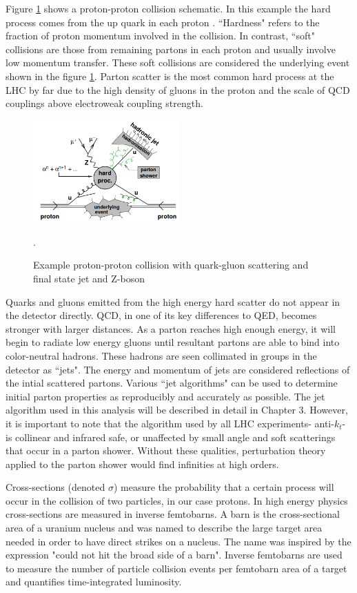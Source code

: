 Figure \ref{fig:protonproton} shows a proton-proton collision schematic. In this example the hard process comes from the up quark in each proton \cite{Butterworth}. ``Hardness" refers to the fraction of proton momentum involved in the collision. In contrast, ``soft" collisions are those from remaining partons in each proton and usually involve low momentum transfer. These soft collisions are considered the underlying event shown in the figure \ref{fig:protonproton}. Parton scatter is the most common hard process at the LHC by far due to the high density of gluons in the proton and the scale of QCD couplings above electroweak coupling strength. 
\begin{figure}[H]
        \centering
    \includegraphics[width=0.5\textwidth] {Pictures/protonproton.png}\hspace{1cm}
    \caption{Example proton-proton collision with quark-gluon scattering and final state jet and Z-boson \cite{Butterworth}}.
    \label{fig:protonproton}
\end{figure}
Quarks and gluons emitted from the high energy hard scatter do not appear in the detector directly. QCD, in one of its key differences to QED, becomes stronger with larger distances. As a parton reaches high enough energy, it will begin to radiate low energy gluons until resultant partons are able to bind into color-neutral hadrons. These hadrons are seen collimated in groups in the detector as ``jets". The energy and momentum of jets are considered reflections of the intial scattered partons. Various ``jet algorithms" can be used to determine initial parton properties as reproducibly and accurately as possible. The jet algorithm used in this analysis will be described in detail in Chapter 3. However, it is important to note that the algorithm used by all LHC experiments- anti-$k_t$- is collinear and infrared safe, or unaffected by small angle and soft scatterings that occur in a parton shower. Without these qualities, perturbation theory applied to the parton shower would find infinities at high orders.

Cross-sections (denoted $\sigma$) measure the probability that a certain process will occur in the collision of two particles, in our case protons. In high energy physics cross-sections are measured in inverse femtobarns. A barn is the cross-sectional area of a uranium nucleus and was named to describe the large target area needed in order to have direct strikes on a nucleus. The name was inspired by the expression "could not hit the broad side of a barn". Inverse femtobarns are used to measure the number of particle collision events per femtobarn area of a target and quantifies time-integrated luminosity. 

